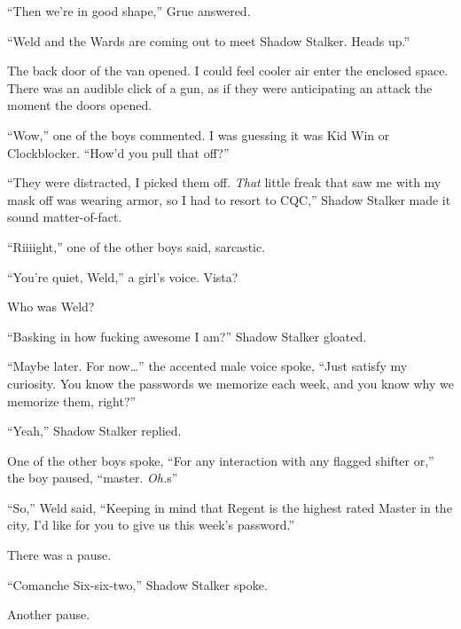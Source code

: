 ``Then we're in good shape,'' Grue answered.



``Weld and the Wards are coming out to meet Shadow Stalker.  Heads up.''



The back door of the van opened.  I could feel cooler air enter the enclosed space.  There was an audible click of a gun, as if they were anticipating an attack the moment the doors opened.



``Wow,'' one of the boys commented.  I was guessing it was Kid Win or Clockblocker.  ``How'd you pull that off?''



``They were distracted, I picked them off.  \emph{That} little freak that saw me with my mask off was wearing armor, so I had to resort to CQC,'' Shadow Stalker made it sound matter-of-fact.



``Riiiight,'' one of the other boys said, sarcastic.



``You're quiet, Weld,'' a girl's voice.  Vista?



Who was Weld?



``Basking in how fucking awesome I am?'' Shadow Stalker gloated.



``Maybe later.  For now\ldots'' the accented male voice spoke, ``Just satisfy my curiosity.  You know the passwords we memorize each week, and you know why we memorize them, right?''



``Yeah,'' Shadow Stalker replied.



One of the other boys spoke, ``For any interaction with any flagged shifter or,'' the boy paused, ``master.  \emph{Oh.}s''



``So,'' Weld said, ``Keeping in mind that Regent is the highest rated Master in the city, I'd like for you to give us this week's password.''



There was a pause.



``Comanche Six-six-two,'' Shadow Stalker spoke.



Another pause.




